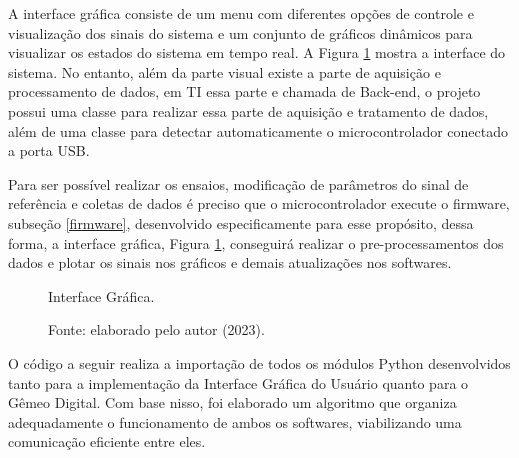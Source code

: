 
A interface gráfica consiste de um menu com diferentes opções de controle e visualização dos sinais do sistema e um conjunto de gráficos dinâmicos para visualizar os estados do sistema em tempo real. A Figura \ref{fig3:image_14} mostra a interface do sistema. No entanto, além da parte visual existe a parte de aquisição e processamento de dados, em TI essa parte e chamada de Back-end, o projeto possui uma classe para realizar essa parte de aquisição e tratamento de dados, além de uma classe para detectar automaticamente o microcontrolador conectado a porta USB.

Para ser possível realizar os ensaios, modificação de parâmetros do sinal de referência e coletas de dados é preciso que o microcontrolador execute o firmware, subseção \ref{firmware}, desenvolvido especificamente para esse propósito, dessa forma, a interface gráfica, Figura \ref{fig3:image_14}, conseguirá realizar o pre-processamentos dos dados e plotar os sinais nos gráficos e demais atualizações nos softwares.

\begin{figure}[!h]
	\centering
	\caption{Interface Gráfica.}
        \vspace{0.001cm}
	\caption*{Fonte: elaborado pelo autor (2023).}
	\label{fig3:image_14}
\end{figure}



O código a seguir realiza a importação de todos os módulos Python desenvolvidos tanto para a implementação da Interface Gráfica do Usuário quanto para o Gêmeo Digital. Com base nisso, foi elaborado um algoritmo que organiza adequadamente o funcionamento de ambos os softwares, viabilizando uma comunicação eficiente entre eles.

\vspace{0.5cm}

